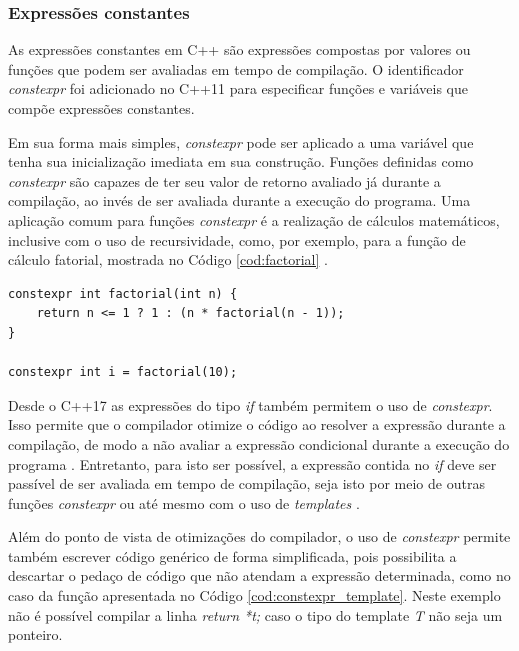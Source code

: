 \subsubsection{Expressões constantes}

As expressões constantes em C++ são expressões compostas por valores ou funções
que podem ser avaliadas em tempo de compilação. O identificador
\textit{constexpr} foi adicionado no C++11 para especificar funções e variáveis
que compõe expressões constantes.

Em sua forma mais simples, \textit{constexpr} pode ser aplicado a uma variável
que tenha sua inicialização imediata em sua construção. Funções definidas como
\textit{constexpr} são capazes de ter seu valor de retorno avaliado já durante a
compilação, ao invés de ser avaliada durante a execução do programa. Uma
aplicação comum para funções \textit{constexpr} é a realização de cálculos
matemáticos, inclusive com o uso de recursividade, como, por exemplo, para a
função de cálculo fatorial, mostrada no Código \ref{cod:factorial}
\cite{constexpr_2017}.

\begin{lstlisting}[caption = {Aplicação de função \textit{constexpr}}, float=htb,
source = {Adaptado de \citeonline{constexpr_2017}},
label = {cod:factorial}]
constexpr int factorial(int n) {
    return n <= 1 ? 1 : (n * factorial(n - 1));
}

constexpr int i = factorial(10);
\end{lstlisting}

Desde o C++17 as expressões do tipo \textit{if} também permitem o uso de
\textit{constexpr}. Isso permite que o compilador otimize o código ao resolver a
expressão durante a compilação, de modo a não avaliar a expressão condicional
durante a execução do programa \cite{cpp_primer}. Entretanto, para isto ser
possível, a expressão contida no \textit{if} deve ser passível de ser avaliada
em tempo de compilação, seja isto por meio de outras funções \textit{constexpr}
ou até mesmo com o uso de \textit{templates} \cite{turner_2017}.

Além do ponto de vista de otimizações do compilador, o uso de \textit{constexpr}
permite também escrever código genérico de forma simplificada, pois possibilita
a descartar o pedaço de código que não atendam a expressão determinada, como no
caso da função apresentada no Código \ref{cod:constexpr_template}. Neste exemplo
não é possível compilar a linha \textit{return *t;} caso o tipo do template
\textit{T} não seja um ponteiro.

